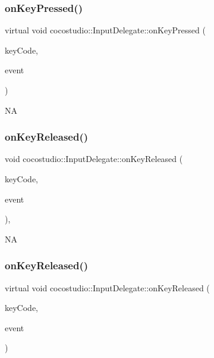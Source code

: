 \subsubsection{\texorpdfstring{on\+Key\+Pressed()}{onKeyPressed()}\hspace{0.1cm}{\footnotesize\ttfamily [2/2]}}
{\footnotesize\ttfamily virtual void cocostudio\+::\+Input\+Delegate\+::on\+Key\+Pressed (\begin{DoxyParamCaption}\item[{cocos2d\+::\+Event\+Keyboard\+::\+Key\+Code}]{key\+Code,  }\item[{cocos2d\+::\+Event $\ast$}]{event }\end{DoxyParamCaption})\hspace{0.3cm}{\ttfamily [virtual]}}

NA \mbox{\label{classcocostudio_1_1InputDelegate_a0bbe5cb845ca74bbef5b47bbe7368228}} 
\subsubsection{\texorpdfstring{on\+Key\+Released()}{onKeyReleased()}\hspace{0.1cm}{\footnotesize\ttfamily [1/2]}}
{\footnotesize\ttfamily void cocostudio\+::\+Input\+Delegate\+::on\+Key\+Released (\begin{DoxyParamCaption}\item[{cocos2d\+::\+Event\+Keyboard\+::\+Key\+Code}]{key\+Code,  }\item[{cocos2d\+::\+Event $\ast$}]{event }\end{DoxyParamCaption})\hspace{0.3cm}{\ttfamily [inline]}, {\ttfamily [virtual]}}

NA \mbox{\label{classcocostudio_1_1InputDelegate_aa58c346c9746d193c23eba5988b93490}} 
\subsubsection{\texorpdfstring{on\+Key\+Released()}{onKeyReleased()}\hspace{0.1cm}{\footnotesize\ttfamily [2/2]}}
{\footnotesize\ttfamily virtual void cocostudio\+::\+Input\+Delegate\+::on\+Key\+Released (\begin{DoxyParamCaption}\item[{cocos2d\+::\+Event\+Keyboard\+::\+Key\+Code}]{key\+Code,  }\item[{cocos2d\+::\+Event $\ast$}]{event }\end{DoxyParamCaption})\hspace{0.3cm}{\ttfamily [virtual]}}

